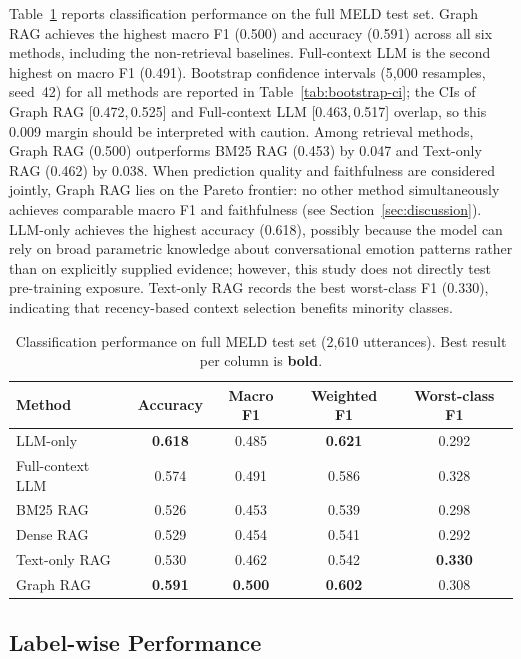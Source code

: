 \documentclass[runningheads]{llncs}
\begin{document}
Table~\ref{tab:overall-performance} reports classification performance on
the full MELD test set. Graph RAG achieves the highest macro F1 (0.500)
and accuracy (0.591) across all six methods, including the non-retrieval
baselines. Full-context LLM is the second highest on macro F1 (0.491).
Bootstrap confidence intervals (5{,}000 resamples, seed~42) for all methods
are reported in Table~\ref{tab:bootstrap-ci}; the CIs of Graph RAG
[0.472,\,0.525] and Full-context LLM [0.463,\,0.517] overlap, so this
0.009 margin should be interpreted with caution. Among retrieval methods,
Graph RAG (0.500) outperforms BM25 RAG (0.453) by 0.047 and Text-only
RAG (0.462) by 0.038. When prediction quality and faithfulness are
considered jointly, Graph RAG lies on the Pareto frontier: no other
method simultaneously achieves comparable macro F1 and faithfulness
(see Section~\ref{sec:discussion}). LLM-only achieves the highest
accuracy (0.618), possibly because the model can rely on broad parametric
knowledge about conversational emotion patterns rather than on explicitly
supplied evidence; however, this study does not directly test
pre-training exposure. Text-only RAG records the best worst-class F1
(0.330), indicating that recency-based context selection benefits
minority classes.

\begin{table}
\centering
\caption{Classification performance on full MELD test set (2{,}610 utterances).
Best result per column is \textbf{bold}.}
\label{tab:overall-performance}
\begin{tabular}{lcccc}
\toprule
Method & Accuracy & Macro F1 & Weighted F1 & Worst-class F1 \\
\midrule
LLM-only          & \textbf{0.618} & 0.485 & \textbf{0.621} & 0.292 \\
Full-context LLM  & 0.574          & 0.491 & 0.586          & 0.328 \\
BM25 RAG          & 0.526          & 0.453 & 0.539          & 0.298 \\
Dense RAG         & 0.529          & 0.454 & 0.541          & 0.292 \\
Text-only RAG     & 0.530          & 0.462 & 0.542          & \textbf{0.330} \\
Graph RAG         & \textbf{0.591} & \textbf{0.500} & \textbf{0.602} & 0.308 \\
\bottomrule
\end{tabular}
\end{table}

\subsection{Label-wise Performance}
\end{document}
